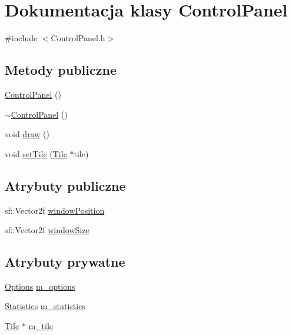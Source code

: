 \hypertarget{class_control_panel}{}\section{Dokumentacja klasy Control\+Panel}
\label{class_control_panel}


{\ttfamily \#include $<$Control\+Panel.\+h$>$}

\subsection*{Metody publiczne}
\begin{DoxyCompactItemize}
\item 
\mbox{\hyperlink{class_control_panel_ae9a88e3d1edf51b1b3dad989d2ce7140}{Control\+Panel}} ()
\item 
\mbox{\hyperlink{class_control_panel_aaa18bb1c97830df080f39d8abb2d1bd5}{$\sim$\+Control\+Panel}} ()
\item 
void \mbox{\hyperlink{class_control_panel_a0dc73223e82ee588c1ac61d4f9c3082e}{draw}} ()
\item 
void \mbox{\hyperlink{class_control_panel_a76244d427bb5a852b55c1d0e79e363de}{set\+Tile}} (\mbox{\hyperlink{class_tile}{Tile}} $\ast$tile)
\end{DoxyCompactItemize}
\subsection*{Atrybuty publiczne}
\begin{DoxyCompactItemize}
\item 
sf\+::\+Vector2f \mbox{\hyperlink{class_control_panel_afef4fad7217719a2dc9df005a40efda0}{window\+Position}}
\item 
sf\+::\+Vector2f \mbox{\hyperlink{class_control_panel_ac270884ed654aa0c068d551b4653e39c}{window\+Size}}
\end{DoxyCompactItemize}
\subsection*{Atrybuty prywatne}
\begin{DoxyCompactItemize}
\item 
\mbox{\hyperlink{class_options}{Options}} \mbox{\hyperlink{class_control_panel_a662113a86b5fa2be4790dd5b403e3f70}{m\+\_\+options}}
\item 
\mbox{\hyperlink{class_statistics}{Statistics}} \mbox{\hyperlink{class_control_panel_a330f6c6c7326c3b76b13e4423108fc88}{m\+\_\+statistics}}
\item 
\mbox{\hyperlink{class_tile}{Tile}} $\ast$ \mbox{\hyperlink{class_control_panel_a9515f025047a35dba24b6ac94c7a55bd}{m\+\_\+tile}}
\end{DoxyCompactItemize}


